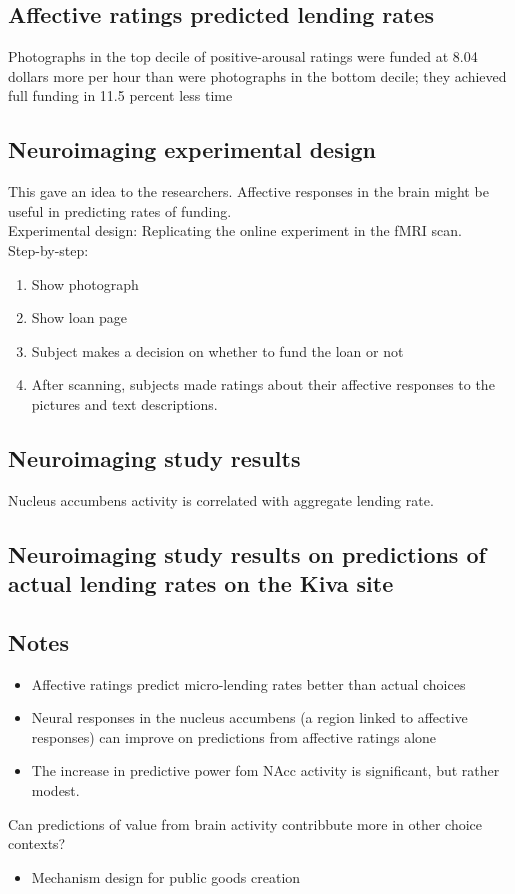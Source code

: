 \subsection{Affective ratings predicted lending rates}
Photographs in the top decile of positive-arousal ratings were funded at 8.04 dollars more per hour than were photographs in the bottom decile; they achieved full funding in 11.5 percent less time
\subsection{Neuroimaging experimental design}
This gave an idea to the researchers. Affective responses in the brain might be useful in predicting rates of funding.
\\Experimental design: Replicating the online experiment in the fMRI scan.
\\Step-by-step:
\begin{enumerate}
    \item Show photograph
    \item Show loan page
    \item Subject makes a decision on whether to fund the loan or not
    \item After scanning, subjects made ratings about their affective responses to the pictures and text descriptions.
\end{enumerate}

\subsection{Neuroimaging study results}
Nucleus accumbens activity is correlated with aggregate lending rate. 
\subsection{Neuroimaging study results on predictions of actual lending rates on the Kiva site}

\subsection{Notes}
\begin{itemize}
    \item Affective ratings predict micro-lending rates better than actual choices
    \item Neural responses in the nucleus accumbens (a region linked to affective responses) can improve on predictions from affective ratings alone
    \item The increase in predictive power fom NAcc activity is significant, but rather modest.
\end{itemize}
Can predictions of value from brain activity contribbute more in other choice contexts?
\begin{itemize}
    \item Mechanism design for public goods creation
    \end{itemize}

